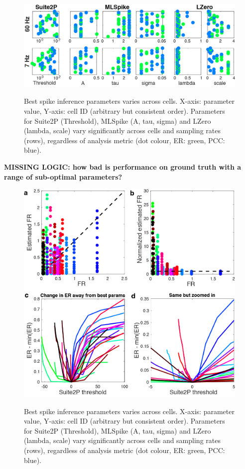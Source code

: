 \documentclass[a4paper,10pt,twocolumn]{article}
\begin{document}
\begin{figure}[h!]
{\includegraphics[width=\textwidth]{full_figs/why_deconvolve_F1_3.png}}
{\caption{Best spike inference parameters varies across cells. X-axis: parameter value, Y-axis: cell ID (arbitrary but consistent order). Parameters for Suite2P (Threshold), MLSpike (A, tau, sigma) and LZero (lambda, scale) vary significantly across cells and sampling rates (rows), regardless of analysis metric (dot colour, ER: green, PCC: blue).
\label{fig:GT_data_params}}}
\end{figure}

\textbf{MISSING LOGIC: how bad is performance on ground truth with a range of sub-optimal parameters?}\\

\begin{figure}[h!]
{\includegraphics[width=\textwidth]{full_figs/why_deconvolve_F1_4_colours.png}}
{\caption{Best spike inference parameters varies across cells. X-axis: parameter value, Y-axis: cell ID (arbitrary but consistent order). Parameters for Suite2P (Threshold), MLSpike (A, tau, sigma) and LZero (lambda, scale) vary significantly across cells and sampling rates (rows), regardless of analysis metric (dot colour, ER: green, PCC: blue).
\label{fig:GT_data_params}}}
\end{figure}
\end{document}
